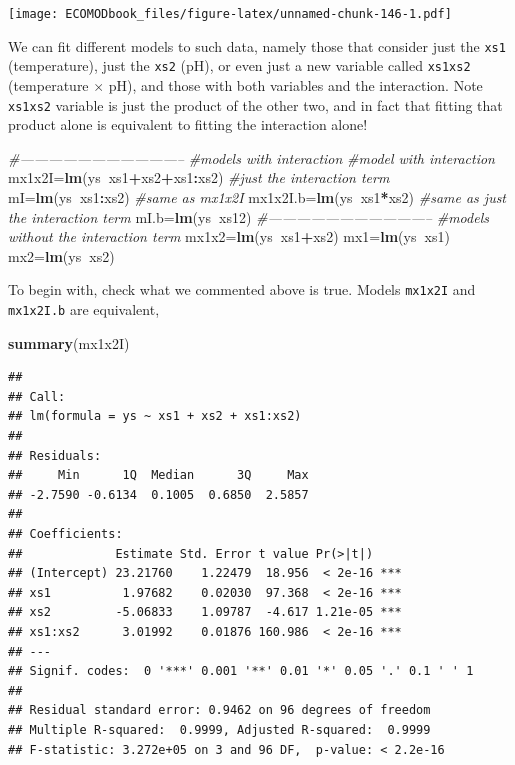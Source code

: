 \documentclass[
]{book}
\newenvironment{Shaded}{\begin{snugshade}}{\end{snugshade}}
\newcommand{\CommentTok}[1]{\textcolor[rgb]{0.56,0.35,0.01}{\textit{#1}}}
\newcommand{\KeywordTok}[1]{\textcolor[rgb]{0.13,0.29,0.53}{\textbf{#1}}}
\newcommand{\NormalTok}[1]{#1}
\newcommand{\OperatorTok}[1]{\textcolor[rgb]{0.81,0.36,0.00}{\textbf{#1}}}
\begin{document}
\texttt{[image: ECOMODbook\_files/figure-latex/unnamed-chunk-146-1.pdf]}

We can fit different models to such data, namely those that consider just the \texttt{xs1} (temperature), just the \texttt{xs2} (pH), or even just a new variable called \texttt{xs1xs2} (temperature \(\times\) pH), and those with both variables and the interaction. Note \texttt{xs1xs2} variable is just the product of the other two, and in fact that fitting that product alone is equivalent to fitting the interaction alone!

\begin{Shaded}
\begin{Highlighting}[]
\CommentTok{#-----------------------------------}
\CommentTok{#models with interaction}
\CommentTok{#model with interaction}
\NormalTok{mx1x2I=}\KeywordTok{lm}\NormalTok{(ys}\OperatorTok{~}\NormalTok{xs1}\OperatorTok{+}\NormalTok{xs2}\OperatorTok{+}\NormalTok{xs1}\OperatorTok{:}\NormalTok{xs2)}
\CommentTok{#just the interaction term}
\NormalTok{mI=}\KeywordTok{lm}\NormalTok{(ys}\OperatorTok{~}\NormalTok{xs1}\OperatorTok{:}\NormalTok{xs2)}
\CommentTok{#same as mx1x2I}
\NormalTok{mx1x2I.b=}\KeywordTok{lm}\NormalTok{(ys}\OperatorTok{~}\NormalTok{xs1}\OperatorTok{*}\NormalTok{xs2)}
\CommentTok{#same as just the interaction term}
\NormalTok{mI.b=}\KeywordTok{lm}\NormalTok{(ys}\OperatorTok{~}\NormalTok{xs12)}
\CommentTok{#-----------------------------------}
\CommentTok{#models without the interaction term}
\NormalTok{mx1x2=}\KeywordTok{lm}\NormalTok{(ys}\OperatorTok{~}\NormalTok{xs1}\OperatorTok{+}\NormalTok{xs2)}
\NormalTok{mx1=}\KeywordTok{lm}\NormalTok{(ys}\OperatorTok{~}\NormalTok{xs1)}
\NormalTok{mx2=}\KeywordTok{lm}\NormalTok{(ys}\OperatorTok{~}\NormalTok{xs2)}
\end{Highlighting}
\end{Shaded}

To begin with, check what we commented above is true. Models \texttt{mx1x2I} and \texttt{mx1x2I.b} are equivalent,

\begin{Shaded}
\begin{Highlighting}[]
\KeywordTok{summary}\NormalTok{(mx1x2I)}
\end{Highlighting}
\end{Shaded}

\begin{verbatim}
## 
## Call:
## lm(formula = ys ~ xs1 + xs2 + xs1:xs2)
## 
## Residuals:
##     Min      1Q  Median      3Q     Max 
## -2.7590 -0.6134  0.1005  0.6850  2.5857 
## 
## Coefficients:
##             Estimate Std. Error t value Pr(>|t|)    
## (Intercept) 23.21760    1.22479  18.956  < 2e-16 ***
## xs1          1.97682    0.02030  97.368  < 2e-16 ***
## xs2         -5.06833    1.09787  -4.617 1.21e-05 ***
## xs1:xs2      3.01992    0.01876 160.986  < 2e-16 ***
## ---
## Signif. codes:  0 '***' 0.001 '**' 0.01 '*' 0.05 '.' 0.1 ' ' 1
## 
## Residual standard error: 0.9462 on 96 degrees of freedom
## Multiple R-squared:  0.9999,	Adjusted R-squared:  0.9999 
## F-statistic: 3.272e+05 on 3 and 96 DF,  p-value: < 2.2e-16
\end{verbatim}
\end{document}
